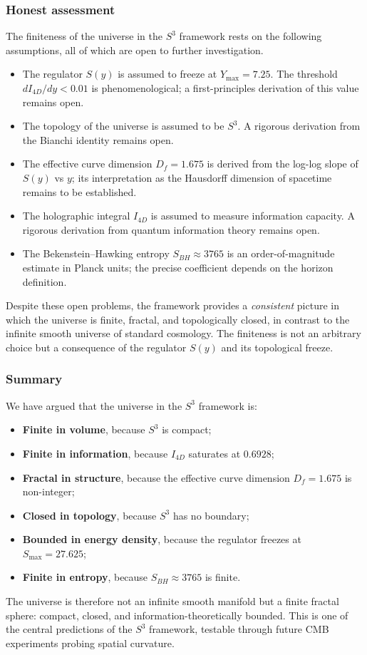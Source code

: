 \documentclass[12pt,oneside,openany]{book}
\begin{document}
\subsubsection{Honest assessment}

The finiteness of the universe in the $S^{3}$ framework rests
on the following assumptions, all of which are open to further
investigation.

\begin{itemize}
\item The regulator $S(y)$ is assumed to freeze at
$Y_{\max}=7.25$. The threshold $dI_{4D}/dy<0.01$ is
phenomenological; a first-principles derivation of this value
remains open.
\item The topology of the universe is assumed to be $S^{3}$. A
rigorous derivation from the Bianchi identity remains open.
\item The effective curve dimension $D_{f}=1.675$ is derived
from the log-log slope of $S(y)$ vs $y$; its interpretation as
the Hausdorff dimension of spacetime remains to be established.
\item The holographic integral $I_{4D}$ is assumed to measure
information capacity. A rigorous derivation from quantum
information theory remains open.
\item The Bekenstein--Hawking entropy $S_{BH}\approx 3765$ is an
order-of-magnitude estimate in Planck units; the precise
coefficient depends on the horizon definition.
\end{itemize}

Despite these open problems, the framework provides a
\emph{consistent} picture in which the universe is finite,
fractal, and topologically closed, in contrast to the infinite
smooth universe of standard cosmology. The finiteness is not an
arbitrary choice but a consequence of the regulator $S(y)$ and
its topological freeze.

\subsubsection{Summary}

We have argued that the universe in the $S^{3}$ framework is:
\begin{itemize}
\item \textbf{Finite in volume}, because $S^{3}$ is compact;
\item \textbf{Finite in information}, because $I_{4D}$ saturates
at $0.6928$;
\item \textbf{Fractal in structure}, because the effective
curve dimension $D_{f}=1.675$ is non-integer;
\item \textbf{Closed in topology}, because $S^{3}$ has no
boundary;
\item \textbf{Bounded in energy density}, because the regulator
freezes at $S_{\max}=27.625$;
\item \textbf{Finite in entropy}, because $S_{BH}\approx 3765$
is finite.
\end{itemize}
The universe is therefore not an infinite smooth manifold but
a finite fractal sphere: compact, closed, and
information-theoretically bounded. This is one of the central
predictions of the $S^{3}$ framework, testable through future
CMB experiments probing spatial curvature.
\end{document}
